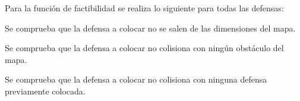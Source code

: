 Para la función de factibilidad se realiza lo siguiente para todas las defensas:
\begin{ennumerate}
	\item Se comprueba que la defensa a colocar no se salen de las dimensiones del mapa.
	\item Se comprueba que la defensa a colocar no colisiona con ningún obstáculo del mapa.
	\item Se comprueba que la defensa a colocar no colisiona con ninguna defensa previamente colocada.
\end{ennumerate}
